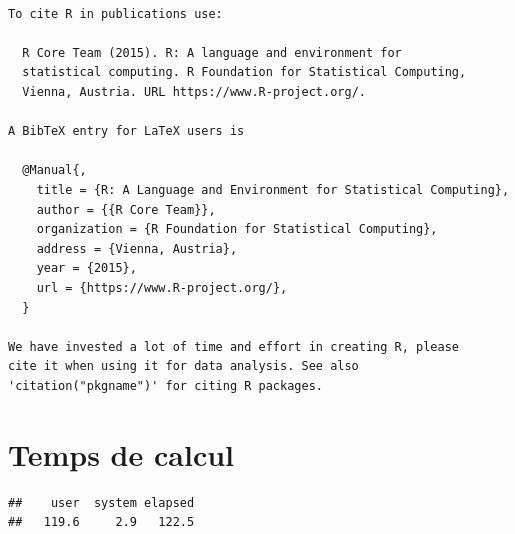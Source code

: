 \documentclass[]{article}
\begin{document}
\begin{verbatim}

To cite R in publications use:

  R Core Team (2015). R: A language and environment for
  statistical computing. R Foundation for Statistical Computing,
  Vienna, Austria. URL https://www.R-project.org/.

A BibTeX entry for LaTeX users is

  @Manual{,
    title = {R: A Language and Environment for Statistical Computing},
    author = {{R Core Team}},
    organization = {R Foundation for Statistical Computing},
    address = {Vienna, Austria},
    year = {2015},
    url = {https://www.R-project.org/},
  }

We have invested a lot of time and effort in creating R, please
cite it when using it for data analysis. See also
'citation("pkgname")' for citing R packages.
\end{verbatim}

\section{Temps de calcul}\label{temps-de-calcul}

\begin{verbatim}
##    user  system elapsed 
##   119.6     2.9   122.5
\end{verbatim}
\end{document}
